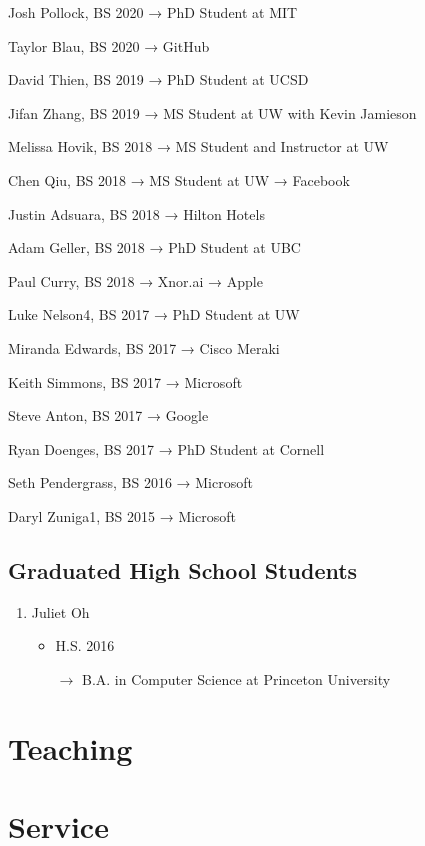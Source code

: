 \documentclass[10pt]{article}
\begin{document}
Josh Pollock, BS 2020
    → PhD Student at MIT

Taylor Blau, BS 2020
    → GitHub

David Thien, BS 2019
    → PhD Student at UCSD

Jifan Zhang, BS 2019
    → MS Student at UW with Kevin Jamieson

Melissa Hovik, BS 2018
    → MS Student and Instructor at UW

Chen Qiu, BS 2018
    → MS Student at UW
    → Facebook

Justin Adsuara, BS 2018
    → Hilton Hotels

Adam Geller, BS 2018
    → PhD Student at UBC

Paul Curry, BS 2018
    → Xnor.ai
    → Apple

Luke Nelson4, BS 2017
    → PhD Student at UW

Miranda Edwards, BS 2017
    → Cisco Meraki

Keith Simmons, BS 2017
    → Microsoft

Steve Anton, BS 2017
    → Google

Ryan Doenges, BS 2017
    → PhD Student at Cornell

Seth Pendergrass, BS 2016
    → Microsoft

Daryl Zuniga1, BS 2015
    → Microsoft

\subsection*{Graduated High School Students}

\begin{enumerate}[resume]
  \item Juliet Oh
    \begin{itemize}
      \item H.S. 2016
      \item[$\rightarrow$] B.A. in Computer Science at Princeton University
    \end{itemize}
\end{enumerate}

\section*{Teaching}

\section*{Service}
\end{document}

